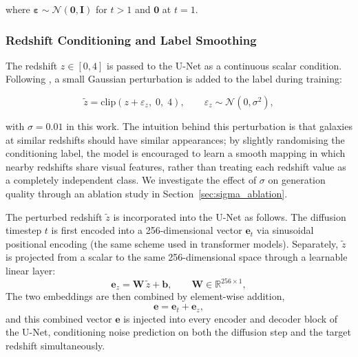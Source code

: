 \documentclass[fleqn,usenatbib]{mnras}
\begin{document}
where $\boldsymbol{\varepsilon} \sim \mathcal{N}(\mathbf{0},\mathbf{I})$
for $t > 1$ and $\mathbf{0}$ at $t = 1$.

\subsubsection{Redshift Conditioning and Label Smoothing}
\label{sec:label_smooth}

The redshift $z \in [0, 4]$ is passed to the U-Net as a continuous
scalar condition.
Following \citet{lizarraga2024}, a small Gaussian perturbation is
added to the label during training:

\begin{equation}
    \tilde{z} = \mathrm{clip}\!\left(z + \varepsilon_z,\; 0,\; 4\right),
    \qquad \varepsilon_z \sim \mathcal{N}(0, \sigma^2),
    \label{eq:label_smooth}
\end{equation}

with $\sigma = 0.01$ in this work.
The intuition behind this perturbation is that galaxies at similar
redshifts should have similar appearances; by slightly randomising
the conditioning label, the model is encouraged to learn a smooth
mapping in which nearby redshifts share visual features, rather than
treating each redshift value as a completely independent class.
We investigate the effect of $\sigma$ on generation quality through
an ablation study in Section~\ref{sec:sigma_ablation}.

The perturbed redshift $\tilde{z}$ is incorporated into the U-Net
as follows.
The diffusion timestep $t$ is first encoded into a 256-dimensional
vector $\mathbf{e}_t$ via sinusoidal positional encoding
(the same scheme used in transformer models).
Separately, $\tilde{z}$ is projected from a scalar to the same
256-dimensional space through a learnable linear layer:
\begin{equation}
    \mathbf{e}_z = \mathbf{W}\,\tilde{z} + \mathbf{b},
    \qquad \mathbf{W} \in \mathbb{R}^{256 \times 1},
    \label{eq:z_embed}
\end{equation}
The two embeddings are then combined by element-wise addition,
\begin{equation}
    \mathbf{e} = \mathbf{e}_t + \mathbf{e}_z,
    \label{eq:combined_embed}
\end{equation}
and this combined vector $\mathbf{e}$ is injected into every
encoder and decoder block of the U-Net, conditioning noise
prediction on both the diffusion step and the target redshift
simultaneously.
\end{document}
